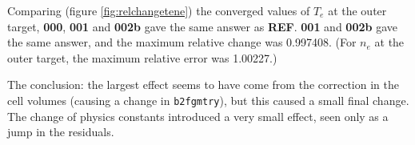 \documentclass[a4paper,10pt]{report}
\begin{document}
Comparing (figure \ref{fig:relchangetene}) the converged values of $T_e$
at the outer target, {\bf 000}, {\bf 001} and {\bf 002b} gave the same
answer as {\bf REF}.  {\bf 001} and {\bf 002b} gave the same answer,
and the maximum relative change was 0.997408. (For $n_e$ at the outer
target, the maximum relative error was 1.00227.)

The conclusion: the largest effect seems to have come from the
correction in the cell volumes (causing a change in {\tt b2fgmtry}),
but this caused a small final change.  The change of physics constants
introduced a very small effect, seen only as a jump in the residuals.





\end{document}
